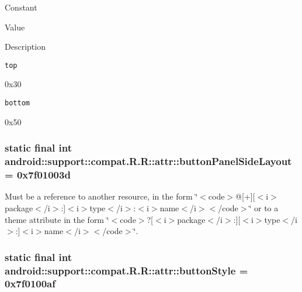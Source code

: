 Constant

Value

Description 

{\tt top}

0x30

{\tt bottom}

0x50\hypertarget{classandroid_1_1support_1_1compat_1_1_r_1_1attr_481632c2d3788567572a80275d62389e}{
\subsubsection[{buttonPanelSideLayout}]{\setlength{\rightskip}{0pt plus 5cm}static final int android::support::compat.R.R::attr::buttonPanelSideLayout = 0x7f01003d}}
\label{classandroid_1_1support_1_1compat_1_1_r_1_1attr_481632c2d3788567572a80275d62389e}


Must be a reference to another resource, in the form \char`\"{}$<$code$>$@\mbox{[}+\mbox{]}\mbox{[}$<$i$>$package$<$/i$>$:\mbox{]}$<$i$>$type$<$/i$>$:$<$i$>$name$<$/i$>$$<$/code$>$\char`\"{} or to a theme attribute in the form \char`\"{}$<$code$>$?\mbox{[}$<$i$>$package$<$/i$>$:\mbox{]}\mbox{[}$<$i$>$type$<$/i$>$:\mbox{]}$<$i$>$name$<$/i$>$$<$/code$>$\char`\"{}. \hypertarget{classandroid_1_1support_1_1compat_1_1_r_1_1attr_b928212d361b6269f375822477d58247}{
\subsubsection[{buttonStyle}]{\setlength{\rightskip}{0pt plus 5cm}static final int android::support::compat.R.R::attr::buttonStyle = 0x7f0100af}}
\label{classandroid_1_1support_1_1compat_1_1_r_1_1attr_b928212d361b6269f375822477d58247}


